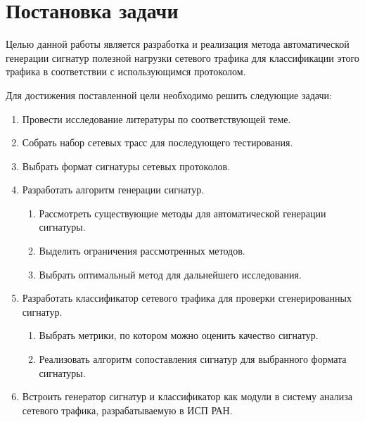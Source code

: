 \section{Постановка задачи}
\label{sec:Section1} 

Целью данной работы является разработка и реализация метода автоматической генерации сигнатур полезной нагрузки сетевого трафика
для классификации этого трафика в соответствии с использующимся протоколом.

Для достижения поставленной цели необходимо решить следующие задачи:

\begin{enumerate}
    \item Провести исследование литературы по соответствующей теме.
    \item Собрать набор сетевых трасс для последующего тестирования.
    \item Выбрать формат сигнатуры сетевых протоколов.
    \item Разработать алгоритм генерации сигнатур.
    \begin{enumerate}
        \item Рассмотреть существующие методы для автоматической генерации сигнатуры.
        \item Выделить ограничения рассмотренных методов.
        \item Выбрать оптимальный метод для дальнейшего исследования.
    \end{enumerate}
    \item Разработать классификатор сетевого трафика для проверки сгенерированных сигнатур.
    \begin{enumerate}
        \item Выбрать метрики, по котором можно оценить качество сигнатур.
        \item Реализовать алгоритм сопоставления сигнатур для выбранного формата сигнатуры.
    \end{enumerate}
    \item Встроить генератор сигнатур и классификатор как модули в систему анализа сетевого трафика, разрабатываемую в ИСП РАН.
\end{enumerate}

\newpage
